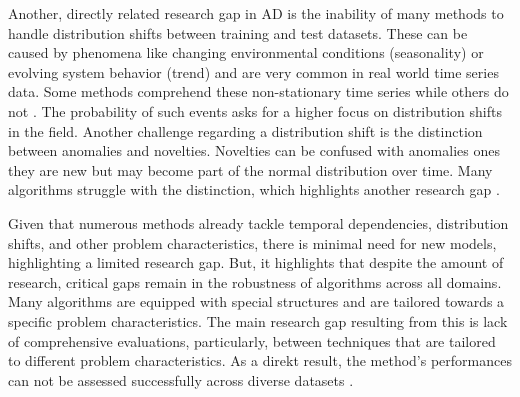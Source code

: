 Another, directly related research gap in AD is the inability of many methods to handle distribution shifts between training and test datasets. These can be caused by phenomena like changing environmental conditions (seasonality) or evolving system behavior (trend) and are very common in real world time series data. Some methods comprehend these non-stationary time series while others do not \cite{Cao2023}. The probability of such events asks for a higher focus on distribution shifts in the field. Another challenge regarding a distribution shift is the distinction between anomalies and novelties. Novelties can be confused with anomalies ones they are new but may become part of the normal distribution over time. Many algorithms struggle with the distinction, which highlights another research gap \cite{Chandola2009}.

Given that numerous methods already tackle temporal dependencies, distribution shifts, and other problem characteristics, there is minimal need for new models, highlighting a limited research gap. But, it highlights that despite the amount of research, critical gaps remain in the robustness of algorithms across all domains. Many algorithms are equipped with special structures and are tailored towards a specific problem characteristics. The main research gap resulting from this is lack of comprehensive evaluations, particularly, between techniques that are tailored to different problem characteristics. As a direkt result, the method's performances can not be assessed successfully across diverse datasets \cite{Braei2020}.